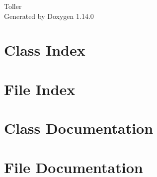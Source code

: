 \documentclass[twoside]{book}
\newcommand{\+}{\discretionary{\mbox{\scriptsize$\hookleftarrow$}}{}{}}
\newcommand{\clearemptydoublepage}{%
    \newpage{\pagestyle{empty}\cleardoublepage}%
  }
\begin{document}
  \raggedbottom
    \hypersetup{pageanchor=false,
                bookmarksnumbered=true,
                pdfencoding=unicode
               }
  \begin{titlepage}
  \vspace*{7cm}
  \begin{center}%
  {\Large Toller}\\
  \vspace*{1cm}
  {\large Generated by Doxygen 1.14.0}\\
  \end{center}
  \end{titlepage}
  \clearemptydoublepage
  \tableofcontents
  \clearemptydoublepage
  \hypersetup{pageanchor=true}
\chapter{Class Index}

\chapter{File Index}

\chapter{Class Documentation}

\chapter{File Documentation}


















  \backmatter
  \newpage
  \clearemptydoublepage
  \printindex
\end{document}
